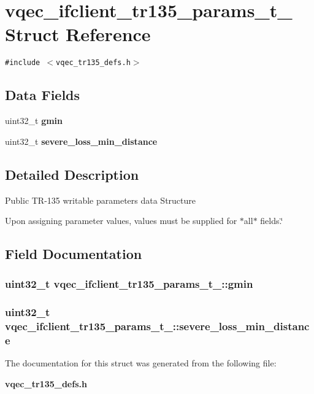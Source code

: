 \section{vqec\_\-ifclient\_\-tr135\_\-params\_\-t\_\- Struct Reference}
\label{structvqec__ifclient__tr135__params__t__}
{\tt \#include $<$vqec\_\-tr135\_\-defs.h$>$}

\subsection*{Data Fields}
\begin{CompactItemize}
\item 
uint32\_\-t \bf{gmin}
\item 
uint32\_\-t \bf{severe\_\-loss\_\-min\_\-distance}
\end{CompactItemize}


\subsection{Detailed Description}
Public TR-135 writable parameters data Structure

Upon assigning parameter values, values must be supplied for $\ast$all$\ast$ fields.\char`\"{} 



\subsection{Field Documentation}
\subsubsection{\setlength{\rightskip}{0pt plus 5cm}uint32\_\-t \bf{vqec\_\-ifclient\_\-tr135\_\-params\_\-t\_\-::gmin}}\label{structvqec__ifclient__tr135__params__t___128fca5c360e16aa107a5b6357bad3fb}


\subsubsection{\setlength{\rightskip}{0pt plus 5cm}uint32\_\-t \bf{vqec\_\-ifclient\_\-tr135\_\-params\_\-t\_\-::severe\_\-loss\_\-min\_\-distance}}\label{structvqec__ifclient__tr135__params__t___99b35cb13e780e330b1891324c8c2ad3}




The documentation for this struct was generated from the following file:\begin{CompactItemize}
\item 
\bf{vqec\_\-tr135\_\-defs.h}\end{CompactItemize}
